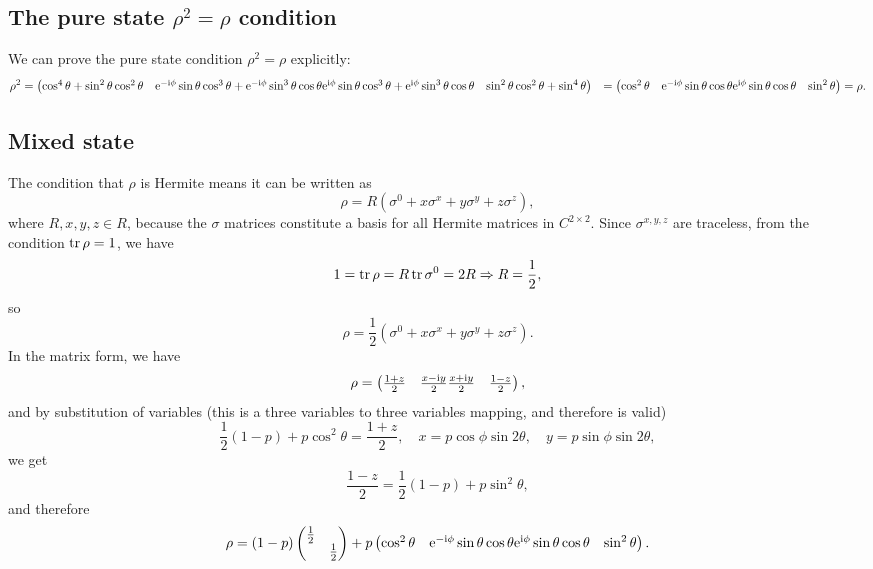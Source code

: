 \documentclass[hyperref, a4paper]{article}
\newcommand*{\ii}{\mathrm{i}}
\newcommand*{\ee}{\mathrm{e}}
\def\\{}%
\def\mathbb#1{#1}%
\begin{document}
\subsection{The pure state $\rho^2 = \rho$ condition}

We can prove the pure state condition $\rho^2 = \rho$ explicitly:
\begin{equation}
    \begin{aligned}
        \rho^2 &= \pmqty{
            \cos^4 \theta + \sin^2 \theta \cos^2 \theta &
            \ee^{- \ii \phi} \sin \theta \cos^3 \theta + 
            \ee^{- \ii \phi} \sin^3 \theta \cos \theta \\
            \ee^{\ii \phi} \sin \theta \cos^3 \theta + 
            \ee^{\ii \phi} \sin^3 \theta \cos \theta &
            \sin^2 \theta \cos^2 \theta + \sin^4 \theta 
        }  \\
        &= \pmqty{
            \cos^2 \theta & \ee^{- \ii \phi} \sin \theta \cos \theta \\
            \ee^{\ii \phi} \sin \theta \cos \theta & \sin^2 \theta
        } = \rho.
    \end{aligned}
\end{equation}

\subsection{Mixed state}

The condition that $\rho$ is Hermite means it can be written as 
\[
    \rho = R (\sigma^0 + x \sigma^x + y \sigma^y + z \sigma^z), 
\]
where $R, x, y, z \in \mathbb{R}$, 
because the $\sigma$ matrices constitute a basis 
for all Hermite matrices in $\mathbb{C}^{2 \times 2}$.
Since $\sigma^{x, y, z}$ are traceless, 
from the condition $\trace \rho = 1$, we have 
\[
    1 = \trace \rho = R \trace \sigma^0 = 2 R \Rightarrow R = \frac{1}{2},
\]
so 
\begin{equation}
    \rho = \frac{1}{2} (\sigma^0 + x \sigma^x + y \sigma^y + z \sigma^z).
    \label{eq:rho-decomposition}
\end{equation}
In the matrix form, we have 
\[
    \rho = \pmqty{
        \frac{1 + z}{2} & \frac{x - \ii y}{2} \\
        \frac{x + \ii y}{2} & \frac{1 - z}{2}
    },
\]
and by substitution of variables 
(this is a three variables to three variables mapping, 
and therefore is valid)
\[
    \frac{1}{2} (1 - p) + p \cos^2 \theta = \frac{1 + z}{2}, 
    \quad x = p \cos \phi \sin 2 \theta, \quad y = p \sin \phi \sin 2 \theta,
\]
we get 
\[
    \frac{1 - z}{2} = \frac{1}{2} (1 - p) + p \sin^2 \theta, 
\]
and therefore
\begin{equation}
    \rho = (1 - p) \pmqty{\dmat{\frac{1}{2}, \frac{1}{2}}} + p \pmqty{
        \cos^2 \theta & \ee^{- \ii \phi} \sin \theta \cos \theta \\
        \ee^{\ii \phi} \sin \theta \cos \theta & \sin^2 \theta
    }.
    \label{eq:general-light-polarization}
\end{equation}
\end{document}
